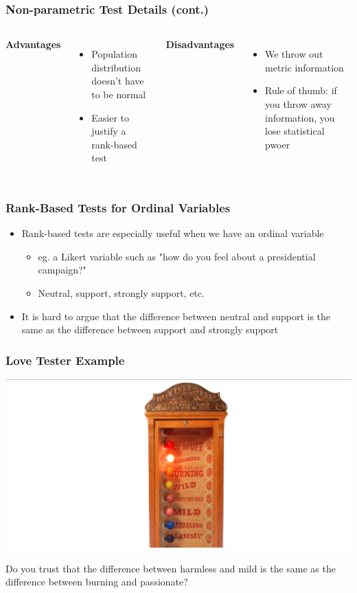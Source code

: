 \documentclass[12pt, block=fill]{beamer}
\begin{document}
\begin{frame}
  \frametitle{Non-parametric Test Details (cont.)}
  \begin{columns}[t]
    \textbf{Advantages}
    \begin{itemize}
        \item Population distribution doesn't have to be normal
        \item Easier to justify a rank-based test
    \end{itemize}
    
    \textbf{Disadvantages}
    \begin{itemize}
        \item We throw out metric information
        \item Rule of thumb: if you throw away information, you lose statistical pwoer
    \end{itemize}
  \end{columns}
    
\end{frame}


\begin{frame}
  \frametitle{Rank-Based Tests for Ordinal Variables}
  \begin{itemize}
      \item Rank-based tests are especially useful when we have an ordinal variable 
      \begin{itemize}
          \item eg. a Likert variable such as "how do you feel about a presidential campaign?"
          \item Neutral, support, strongly support, etc.
      \end{itemize} 
      \item It is hard to argue that the difference between neutral and support is the same as the difference between support and strongly support
  \end{itemize}
    
\end{frame}


\begin{frame}
  \frametitle{Love Tester Example}
  
  \includegraphics[width=1.0\textwidth]{figures/love_tester.png}

  Do you trust that the difference between harmless and mild is the same as the difference between burning and passionate?
    
\end{frame}
\end{document}
